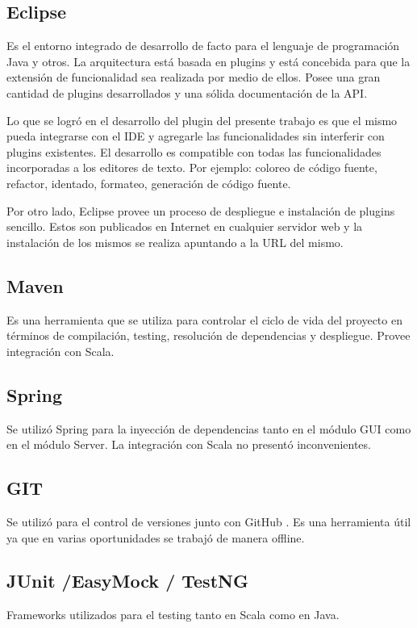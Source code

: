 \documentclass[12pt,a4paper]{article}
\begin{document}
\subsection{Eclipse}
Es el entorno integrado de desarrollo de facto para el lenguaje de programación Java y otros. La arquitectura está basada en plugins y está concebida para que la extensión de funcionalidad sea realizada por medio de ellos. 
Posee una gran cantidad  de plugins desarrollados y una sólida documentación de la API.

Lo que se logró en el desarrollo del plugin del presente trabajo es que el mismo pueda integrarse con el IDE
y agregarle las funcionalidades sin interferir con plugins existentes. El desarrollo es compatible
con todas las funcionalidades incorporadas a los editores de texto. Por ejemplo: coloreo de código fuente, refactor, identado, formateo, generación de código fuente.

Por otro lado, Eclipse provee un proceso de despliegue e instalación de plugins sencillo. Estos son publicados 
en Internet en cualquier servidor web y la instalación de los mismos se realiza apuntando a la URL del mismo.

\subsection{Maven}
Es una herramienta que se utiliza para controlar el ciclo de vida del proyecto en términos de compilación, testing, resolución de dependencias y despliegue. Provee integración con Scala.

\subsection{Spring}
Se utilizó Spring para la inyección de dependencias tanto en el módulo GUI como en el módulo Server. La integración con Scala no presentó inconvenientes.

\subsection{GIT}
Se utilizó para el control de versiones junto con GitHub\cite{github} . Es una herramienta útil ya que en varias oportunidades se trabajó de manera offline.

\subsection{JUnit\cite{junit} /EasyMock \cite{easymock} / TestNG\cite{testng} }
Frameworks utilizados para el testing tanto en Scala como en Java.
\end{document}
